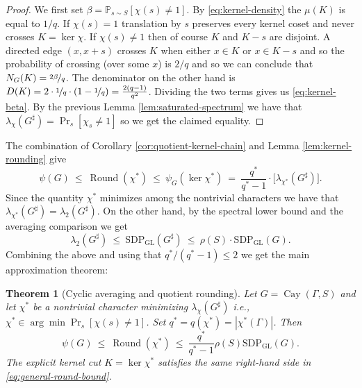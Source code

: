 \documentclass[11pt]{article}
\newtheorem{theorem}{Theorem}[section]
\theoremstyle{definition}
\theoremstyle{remark}
\newcommand{\Prb}{\mathbb{P}}
\newcommand{\Cay}{\operatorname{Cay}}
\newcommand{\roundval}{\operatorname{Round}}
\newcommand{\gl}{\operatorname{SDP_{GL}}}
\begin{document}
\begin{proof}
We first set $\beta=\Prb_{s\sim S}[\chi(s)\neq 1]$.
By \eqref{eq:kernel-density} the $\mu(K)$ is equal to $1/q$. If $\chi(s)=1$ translation by $s$ preserves every kernel coset and never crosses $K = \ker \chi$. If $\chi(s)\ne1$ then of course $K$ and $K-s$ are disjoint. A directed edge $(x,x+s)$ crosses $K$ when either $x\in K$ or $x\in K-s$ and so the  probability of crossing (over some  $x$) is $2/q$ and so we can conclude that $N_G(K)=\nicefrac{2\beta}{q}$.
The denominator on the other hand is $D(K) = 2 \cdot \nicefrac{1}{q} \cdot \left(1-\nicefrac{1}{q}\right) = \frac{2(q-1)}{q^2}$.
Dividing the two terms gives us \eqref{eq:kernel-beta}. By the previous Lemma \ref{lem:saturated-spectrum} we have that $\lambda_\chi(G^\sharp) = \Pr_s[\chi_s \neq 1]$ so we get the claimed equality.
\end{proof}

The combination of Corollary \ref{cor:quotient-kernel-chain} and Lemma \ref{lem:kernel-rounding} give 
\[
  \psi(G)
  ~\leq~\roundval(\chi^*)
  ~\leq~\psi_G(\ker\chi^*)
  ~=~\frac{q^*}{q^*-1}\cdot \bigg[\lambda_{\chi^*}(G^\sharp)\bigg].
\]
Since the quantity $\chi^*$ minimizes among the nontrivial characters we have that $\lambda_{\chi^*}(G^\sharp)=\lambda_2(G^\sharp)$. 
On the other hand, by the spectral lower bound and the averaging comparison we get
\[
  \lambda_2(G^\sharp)
  ~\leq~\gl(G^\sharp)
  ~\leq~\rho(S) \cdot \gl(G).
\]
Combining the above and using that $q^*/(q^*-1)\leq2$ we get the main approximation theorem: 
\begin{theorem}[Cyclic averaging and quotient rounding]\label{thm:general-bound}
Let $G=\Cay(\Gamma,S)$ and let $\chi^*$ be a nontrivial character minimizing $\lambda_\chi(G^\sharp)$ i.e., $\chi^* \in \arg \min \Pr_s[\chi(s) \neq 1]$. Set $q^*=q(\chi^*)=|\chi^*(\Gamma)|$.
Then
\begin{equation}\label{eq:general-round-bound}
  \psi(G)
  ~\leq~ \roundval(\chi^*)
  ~\leq~ \frac{q^*}{q^*-1}\rho(S)\gl(G).
\end{equation}
The explicit kernel cut $K=\ker\chi^*$ satisfies the same right-hand side in \eqref{eq:general-round-bound}.
\end{theorem}
\end{document}
